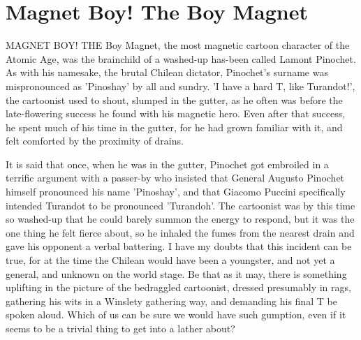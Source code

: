 \chapter{Magnet Boy! The Boy Magnet}

MAGNET BOY! THE Boy Magnet, the most magnetic cartoon character of the Atomic Age, was the brainchild of a washed-up has-been called Lamont Pinochet. As with his namesake, the brutal Chilean dictator, Pinochet's surname was mispronounced as 'Pinoshay' by all and sundry. 'I have a hard T, like Turandot!', the cartoonist used to shout, slumped in the gutter, as he often was before the late-flowering success he found with his magnetic hero. Even after that success, he spent much of his time in the gutter, for he had grown familiar with it, and felt comforted by the proximity of drains.

It is said that once, when he was in the gutter, Pinochet got embroiled in a terrific argument with a passer-by who insisted that General Augusto Pinochet himself pronounced his name 'Pinoshay', and that Giacomo Puccini specifically intended Turandot to be pronounced 'Turandoh'. The cartoonist was by this time so washed-up that he could barely summon the energy to respond, but it was the one thing he felt fierce about, so he inhaled the fumes from the nearest drain and gave his opponent a verbal battering. I have my doubts that this incident can be true, for at the time the Chilean would have been a youngster, and not yet a general, and unknown on the world stage. Be that as it may, there is something uplifting in the picture of the bedraggled cartoonist, dressed presumably in rags, gathering his wits in a Winslety gathering way, and demanding his final T be spoken aloud. Which of us can be sure we would have such gumption, even if it seems to be a trivial thing to get into a lather about?

